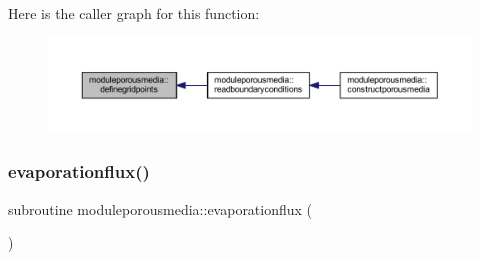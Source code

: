 Here is the caller graph for this function\+:\nopagebreak
\begin{figure}[H]
\begin{center}
\leavevmode
\includegraphics[width=350pt]{namespacemoduleporousmedia_a85940000a15a4caa7221748c12a655c6_icgraph}
\end{center}
\end{figure}
\mbox{\label{namespacemoduleporousmedia_a9e2789b14ba4547dcad30834e1068477}} 
\subsubsection{\texorpdfstring{evaporationflux()}{evaporationflux()}}
{\footnotesize\ttfamily subroutine moduleporousmedia\+::evaporationflux (\begin{DoxyParamCaption}{ }\end{DoxyParamCaption})\hspace{0.3cm}{\ttfamily [private]}}

